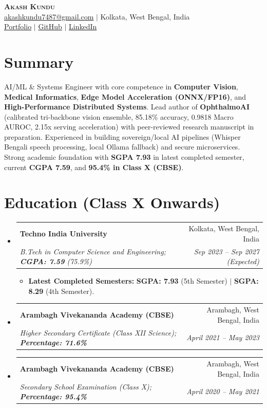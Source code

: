 \documentclass[letterpaper,10pt]{article}
\makeatletter
\newcommand{\resumeItem}[1]{
  \item\small{
    {#1 \vspace{-2pt}}
  }
}
\newcommand{\resumeSubheading}[4]{
  \vspace{-1pt}\item
    \begin{tabular*}{0.97\textwidth}[t]{l@{\extracolsep{\fill}}r}
      \textbf{#1} & #2 \\
      \textit{\small#3} & \textit{\small #4} \\
    \end{tabular*}\vspace{-5pt}
}
\newcommand{\resumeSubHeadingListStart}{\begin{itemize}[leftmargin=0.15in, label={}]}
\newcommand{\resumeSubHeadingListEnd}{\end{itemize}}
\newcommand{\resumeItemListStart}{\begin{itemize}[leftmargin=0.15in]}
\newcommand{\resumeItemListEnd}{\end{itemize}\vspace{-4pt}}
\makeatother
\begin{document}
\begin{center}
    \textbf{\Huge \scshape Akash Kundu} \\ \vspace{2pt}
    \small \href{mailto:akashkundu7487@gmail.com}{akashkundu7487@gmail.com} $|$ Kolkata, West Bengal, India \\ \vspace{1pt}
    \href{https://akashkundu114.github.io}{Portfolio} $|$ \href{https://github.com/AkashKundu114}{GitHub} $|$ \href{https://linkedin.com/in/akashkundu114}{LinkedIn}
\end{center}

\section{Summary}
\vspace{-2pt}
\small{AI/ML \& Systems Engineer with core competence in \textbf{Computer Vision}, \textbf{Medical Informatics}, \textbf{Edge Model Acceleration (ONNX/FP16)}, and \textbf{High-Performance Distributed Systems}. Lead author of \textbf{OphthalmoAI} (calibrated tri-backbone vision ensemble, 85.18\% accuracy, 0.9818 Macro AUROC, 2.15x serving acceleration) with peer-reviewed research manuscript in preparation. Experienced in building sovereign/local AI pipelines (Whisper Bengali speech processing, local Ollama fallback) and secure microservices. Strong academic foundation with \textbf{SGPA 7.93} in latest completed semester, current \textbf{CGPA 7.59}, and \textbf{95.4\% in Class X (CBSE)}.}
\vspace{-2pt}

\section{Education (Class X Onwards)}
  \resumeSubHeadingListStart
    \resumeSubheading
      {Techno India University}{Kolkata, West Bengal, India}
      {B.Tech in Computer Science and Engineering; \textbf{CGPA: 7.59} (75.9\%)}{Sep 2023 -- Sep 2027 (Expected)}
      \resumeItemListStart
        \resumeItem{\textbf{Latest Completed Semesters:} \textbf{SGPA: 7.93} (5th Semester) $|$ \textbf{SGPA: 8.29} (4th Semester).}
      \resumeItemListEnd
    \resumeSubheading
      {Arambagh Vivekananda Academy (CBSE)}{Arambagh, West Bengal, India}
      {Higher Secondary Certificate (Class XII Science); \textbf{Percentage: 71.6\%}}{April 2021 -- May 2023}
    \resumeSubheading
      {Arambagh Vivekananda Academy (CBSE)}{Arambagh, West Bengal, India}
      {Secondary School Examination (Class X); \textbf{Percentage: 95.4\%}}{April 2020 -- May 2021}
  \resumeSubHeadingListEnd
\end{document}
